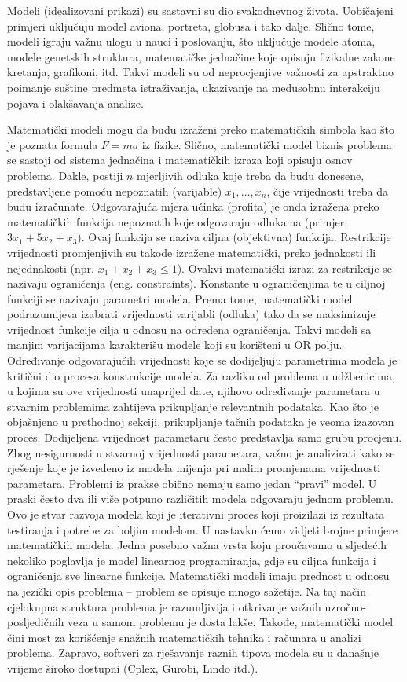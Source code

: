 \documentclass[a4paper, utf8, 11pt, colorlinks]{book}
\begin{document}
Modeli (idealizovani prikazi) su sastavni su dio svakodnevnog života. Uobičajeni 
primjeri uključuju model aviona, portreta, globusa i tako dalje. Slično tome, modeli igraju
važnu ulogu u nauci i poslovanju, što uključuje modele atoma, modele 
genetskih struktura, matematičke jednačine koje opisuju fizikalne zakone kretanja, grafikoni, itd. Takvi modeli
su od neprocjenjive važnosti za apstraktno poimanje suštine predmeta istraživanja, ukazivanje na međusobnu interakciju pojava i olakšavanja analize. 

Matematički modeli mogu da budu izraženi preko matematičkih simbola kao što je poznata formula $F=ma$ iz fizike. Slično, matematički model biznis problema   
se sastoji od sistema jednačina i matematičkih izraza koji opisuju osnov problema. Dakle, postiji $n$ mjerljivih odluka koje treba da budu donesene, predstavljene pomoću nepoznatih (varijable) $x_1,\ldots, x_n$, čije vrijednosti treba da budu izračunate.  Odgovarajuća mjera učinka (profita) je onda izražena preko matematičkih funkcija nepoznatih koje odgovaraju  odlukama (primjer, $3x_1 + 5x_2 + x_3$). Ovaj funkcija se naziva ciljna (objektivna) funkcija. Restrikcije  vrijednosti promjenjivih su takođe izražene matematički, preko jednakosti ili nejednakosti (npr. $x_1 + x_2 + x_3 \leq 1$).  Ovakvi matematički izrazi za restrikcije se nazivaju ograničenja (eng. constraints). Konstante u ograničenjima te u ciljnoj funkciji se nazivaju parametri modela. Prema tome, matematički model 
podrazumijeva izabrati vrijednosti varijabli (odluka) tako da se maksimizuje vrijednost funkcije cilja u odnosu na određena ograničenja. Takvi modeli sa manjim varijacijama karakterišu  modele koji su korišteni u OR polju. 
Određivanje odgovarajućih vrijednosti koje se dodijeljuju parametrima modela je kritični dio procesa konstrukcije modela.
Za razliku od problema u udžbenicima, u kojima su ove vrijednosti unaprijed date, njihovo određivanje parametara u stvarnim problemima zahtijeva prikupljanje relevantnih podataka. Kao što je objašnjeno u prethodnoj sekciji,  prikupljanje tačnih podataka je veoma izazovan proces.  Dodijeljena vrijednost parametaru često predstavlja  samo grubu procjenu. Zbog nesigurnosti u  stvarnoj vrijednosti parametara, važno je analizirati kako se rješenje koje je izvedeno iz modela mijenja pri malim promjenama vrijednosti parametara. 
 Problemi iz prakse obično nemaju samo jedan ``pravi'' model.  U praski   često   dva ili više potpuno različitih modela odgovaraju jednom problemu. 
Ovo je stvar razvoja modela koji je iterativni proces koji proizilazi iz rezultata testiranja i potrebe za boljim modelom.  
 U nastavku ćemo vidjeti brojne primjere matematičkih modela. Jedna posebno važna vrsta koju proučavamo u sljedećih nekoliko poglavlja
je model linearnog programiranja, gdje su ciljna funkcija i ograničenja   sve linearne funkcije. 
Matematički modeli imaju prednost u odnosu na jezički opis problema -- problem se opisuje mnogo sažetije. Na taj način cjelokupna struktura problema je razumljivija i otkrivanje važnih uzročno-posljedičnih veza u samom problemu je dosta lakše. Takođe, matematički
model čini most za korišćenje snažnih matematičkih tehnika i računara u
analizi problema. Zapravo, softveri za rješavanje raznih tipova modela su  u današnje vrijeme  široko dostupni (Cplex, Gurobi, Lindo itd.). 
\end{document}
